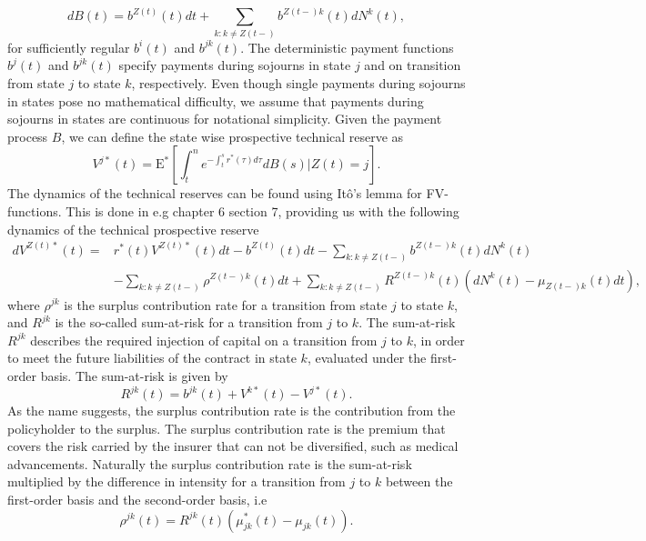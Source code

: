\documentclass[12pt]{article}
\newcommand{\E}{\text{E}}
\theoremstyle{my_thm}
\begin{document}
$$
dB(t)=b^{Z(t)}(t) dt +\sum_{k:k \neq Z(t-)} b^{Z(t-)k}(t)dN^k(t),
$$
for sufficiently regular $b^i(t)$ and $b^{jk}(t)$. The deterministic payment functions $b^j(t)$ and $b^{jk}(t)$ specify payments during sojourns in state $j$ and on transition from state $j$ to state $k$, respectively. Even though single payments during sojourns in states pose no mathematical difficulty, we assume that payments during sojourns in states are continuous for notational simplicity. Given the payment process $B$, we can define the state wise prospective technical reserve as
$$
V^{j*}(t)=\E^*\left[ \int_t^n  e^{-\int_t^s r^*(\tau) d\tau} dB(s) |Z(t)=j \right].
$$
The dynamics of the technical reserves can be found using Itô's lemma for FV-functions. This is done in e.g \citep{RaI} chapter 6 section 7, providing us with the following dynamics of the technical prospective reserve
\begin{align}
dV^{Z(t)*}(t)=
&
r^*(t)V^{Z(t)*}(t)dt - b^{Z(t)}(t)dt -\sum_{k:k\neq Z(t-)}b^{Z(t-)k}(t) dN^k(t)\nonumber
\\
&-\sum_{k:k\neq Z(t-)} \rho^{Z(t-)k}(t) dt
+
\sum_{k:k\neq Z(t-)} R^{Z(t-)k}(t)(dN^k(t)-\mu_{Z(t-)k}(t) dt), \label{eq:AAP}
\end{align}
where $\rho^{jk}$ is the surplus contribution rate for a transition from state $j$ to state $k$, and $R^{jk}$ is the so-called sum-at-risk for a transition from $j$ to $k$. The sum-at-risk $R^{jk}$ describes the required injection of capital on a transition from $j$ to $k$, in order to meet the future liabilities of the contract in state $k$, evaluated under the first-order basis. The sum-at-risk is given by
$$
R^{jk}(t)=b^{jk}(t)+V^{k*}(t)-V^{j*}(t).
$$
As the name suggests, the surplus contribution rate is the contribution from the policyholder to the surplus. The surplus contribution rate is the premium that covers the risk carried by the insurer that can not be diversified, such as medical advancements. Naturally the surplus contribution rate is the sum-at-risk multiplied by the difference in intensity for a transition from $j$ to $k$ between the first-order basis and the second-order basis, i.e
$$
\rho^{jk}(t)=R^{jk}(t)(\mu^*_{jk}(t)-\mu_{jk}(t)).
$$
\end{document}
